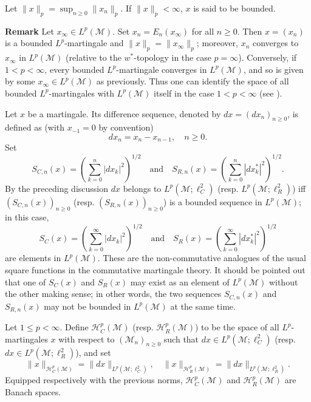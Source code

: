 \documentclass[reqno]{amsart}
\numberwithin{equation}{section}
\begin{document}
Let $\|x\|_p = \sup_{n \geq 0} \|x_n\|_p$. If $\|x\|_p < \infty$, $x$ is said to be bounded.

\textbf{Remark} Let $x_\infty \in L^p(\mathcal{M})$. Set $x_n = E_n(x_\infty)$ for all $n \geq 0$. Then $x = (x_n)$ is a bounded $L^p$-martingale and $\|x\|_p = \|x_\infty\|_p$; moreover, $x_n$ converges to $x_\infty$ in $L^p(\mathcal{M})$ (relative to the $w^*$-topology in the case $p = \infty$). Conversely, if $1 < p < \infty$, every bounded $L^p$-martingale converges in $L^p(\mathcal{M})$, and so is given by some $x_\infty \in L^p(\mathcal{M})$ as previously. Thus one can identify the space of all bounded $L^p$-martingales with $L^p(\mathcal{M})$ itself in the case $1 < p < \infty$ (see \cite{PX93}).


Let $x$ be a martingale. Its difference sequence, denoted by $dx = (dx_n)_{n \geq 0}$, is defined as (with $x_{-1} = 0$ by convention)
\[
dx_n = x_n - x_{n-1}, \quad n \geq 0.
\]
Set
\[
S_{C,n}(x) = \left(\sum_{k=0}^{n} |dx_k|^2\right)^{1/2} \quad \text{and} \quad S_{R,n}(x) = \left(\sum_{k=0}^{n} |dx_k^*|^2\right)^{1/2}.
\]
By the preceding discussion $dx$ belongs to $L^p(\mathcal{M}; \ell^2_C)$ (resp. $L^p(\mathcal{M}; \ell^2_R)$) iff $(S_{C,n}(x))_{n \geq 0}$ (resp. $(S_{R,n}(x))_{n \geq 0}$) is a bounded sequence in $L^p(\mathcal{M})$; in this case,
\[
S_C(x) = \left(\sum_{k=0}^{\infty} |dx_k|^2\right)^{1/2} \quad \text{and} \quad S_R(x) = \left(\sum_{k=0}^{\infty} |dx_k^*|^2\right)^{1/2}
\]
are elements in $L^p(\mathcal{M})$. These are the non-commutative analogues of the usual square functions in the commutative martingale theory. It should be pointed out that one of $S_C(x)$ and $S_R(x)$ may exist as an element of $L^p(\mathcal{M})$ without the other making sense; in other words, the two sequences $S_{C,n}(x)$ and $S_{R,n}(x)$ may not be bounded in $L^p(\mathcal{M})$ at the same time.

Let $1 \leq p < \infty$. Define $\mathcal{H}^p_C(\mathcal{M})$ (resp. $\mathcal{H}^p_R(\mathcal{M})$) to be the space of all $L^p$-martingales $x$ with respect to $(\mathcal{M}_n)_{n \geq 0}$ such that $dx \in L^p(\mathcal{M}; \ell^2_C)$ (resp. $dx \in L^p(\mathcal{M}; \ell^2_R)$), and set
\[
\|x\|_{\mathcal{H}^p_C(\mathcal{M})} = \|dx\|_{L^p(\mathcal{M}; \ell^2_C)}, \quad \|x\|_{\mathcal{H}^p_R(\mathcal{M})} = \|dx\|_{L^p(\mathcal{M}; \ell^2_R)}.
\]
Equipped respectively with the previous norms, $\mathcal{H}^p_C(\mathcal{M})$ and $\mathcal{H}^p_R(\mathcal{M})$ are Banach spaces.
\end{document}
